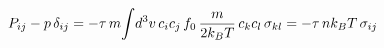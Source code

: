 \documentclass[preview]{standalone}
\begin{document}
\begin{align*}
\special{dvisvgm:raw <g id='unique000'>}P_{ij}-p\,\delta_{ij}=-\tau\,m\!\int\! d^3v\,c_ic_j\,f_0\,\frac{m}{2k_BT}\,c_kc_l\,\sigma_{kl}=-\tau\,nk_BT\,\sigma_{ij}\special{dvisvgm:raw </g>}
\end{align*}
\end{document}
